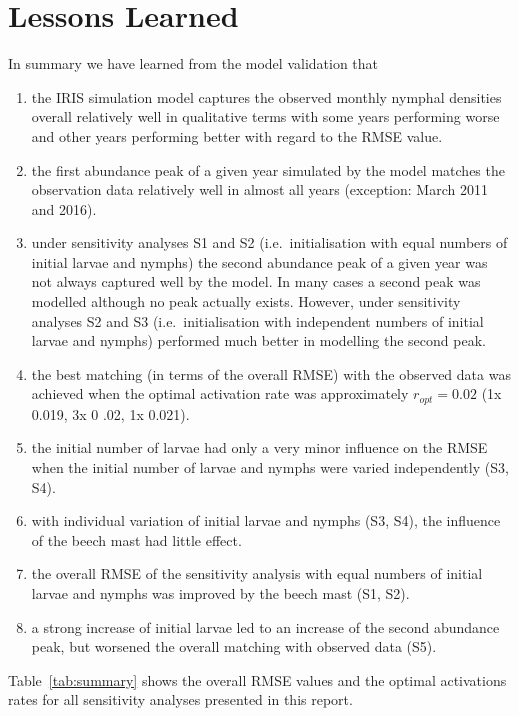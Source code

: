 \documentclass[a4paper, 11pt]{scrartcl}
\begin{document}
\section{Lessons Learned}
In summary we have learned from the model validation that

\begin{enumerate}
\item the IRIS simulation model captures the observed monthly nymphal densities overall relatively well in qualitative terms with some years performing worse and other years
performing better with regard to the RMSE value.
\item the first abundance peak of a given year simulated by the model matches the observation data relatively well in almost all years (exception: March 2011 and 2016).
\item under sensitivity analyses S1 and S2 (i.e.\ initialisation with equal numbers of initial larvae and nymphs) the second abundance peak of a given year was not always
captured well by the model. In many cases a second peak was modelled although no peak actually exists. However, under sensitivity analyses S2 and S3 (i.e.\ initialisation with
independent numbers of initial larvae and nymphs) performed much better in modelling the second peak.
\item the best matching (in terms of the overall RMSE) with the observed data was achieved when the optimal activation rate was approximately $r_{opt} = 0.02$ (1x 0.019,  3x 0
.02,  1x 0.021).
\item the initial number of larvae had only a very minor influence on the RMSE when the initial number of larvae and nymphs were varied independently (S3, S4).
\item with individual variation of initial larvae and nymphs (S3, S4), the influence of the beech mast had little effect.
\item the overall RMSE of the sensitivity analysis with equal numbers of initial larvae and nymphs was improved by the beech mast (S1, S2).
\item a strong increase of initial larvae led to an increase of the second abundance peak, but worsened the overall matching with observed data (S5).
\end{enumerate}

Table~\ref{tab:summary} shows the overall RMSE values and the optimal activations rates for all sensitivity analyses presented in this report.
\end{document}
